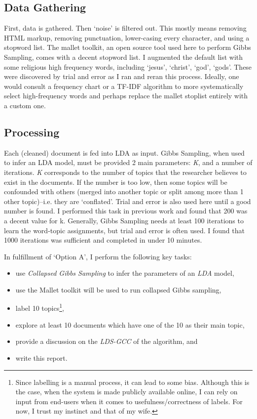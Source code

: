 \subsection{Data Gathering}
First, data is gathered. Then `noise' is filtered out. This mostly means removing HTML markup, removing punctuation, lower-casing every character, and using a stopword list. The mallet toolkit, an open source tool used here to perform Gibbs Sampling, comes with a decent stopword list. I augmented the default list with some religious high frequency words, including `jesus', `christ', `god', `gods'. These were discovered by trial and error as I ran and reran this process. Ideally, one would consult a frequency chart or a TF-IDF algorithm to more systematically select high-frequency words and perhaps replace the mallet stoplist entirely with a custom one.

\subsection{Processing}
Each (cleaned) document is fed into LDA as input. Gibbs Sampling, when used to infer an LDA model, must be provided 2 main parameters: \emph{K}, and a number of iterations. \emph{K} corresponds to the number of topics that the researcher believes to exist in the documents. If the number is too low, then some topics will be confounded with others (merged into another topic or split among more than 1 other topic)--i.e. they are `conflated'. Trial and error is also used here until a good number is found. I performed this task in previous work and found that 200 was a decent value for k. Generally, Gibbs Sampling needs at least 100 iterations to learn the word-topic assignments, but trial and error is often used. I found that 1000 iterations was sufficient and completed in under 10 minutes. 

In fulfillment of `Option A', I perform the following key tasks: 

\begin{itemize}
    \item use \emph{Collapsed Gibbs Sampling} to infer the parameters of an \emph{LDA} model,
    \item use the Mallet toolkit will be used to run collapsed Gibbs sampling,
    \item label 10 topics\footnote{Since labelling is a manual process, it can lead to some bias. Although this is the case, when the system is made publicly available online, I can rely on input from end-users when it comes to usefulness/correctness of labels. For now, I trust my instinct and that of my wife.},
    \item explore at least 10 documents which have one of the 10 as their main topic,
    \item provide a discussion on the \emph{LDS-GCC} of the algorithm, and
    \item write this report.
\end{itemize}


